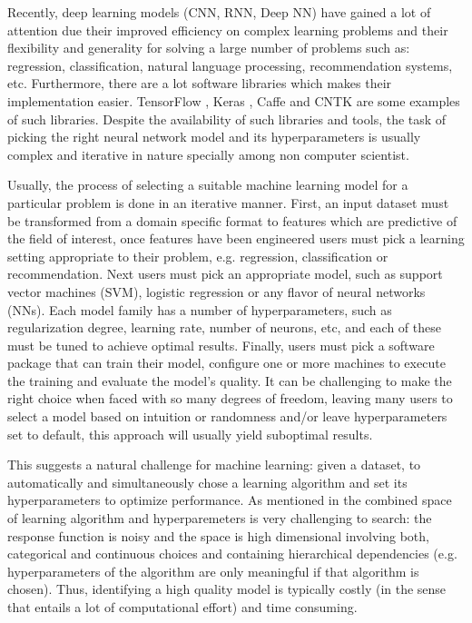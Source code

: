 \documentclass[journal]{IEEEtran}
\begin{document}
Recently, deep learning models (CNN, RNN, Deep NN) have gained a lot of attention due their improved efficiency on complex learning problems and their flexibility and generality for solving a large number of problems such as: regression, classification, natural language processing, recommendation systems, etc. Furthermore, there are a lot software libraries which makes their implementation easier. TensorFlow \cite{TensorFlow2015}, Keras \cite{keras2015}, Caffe \cite{caffe2014} and CNTK \cite{cntk2016} are some examples of such libraries. Despite the availability of such libraries and tools, the task of picking the right neural network model  and its hyperparameters is usually complex and iterative in nature specially among non computer scientist.

Usually, the process of selecting a suitable machine learning model for a particular problem is done in an iterative manner. First, an input dataset must be transformed from a domain specific format to features which are predictive of the field of interest, once features have been engineered users must pick a learning setting appropriate to their problem, e.g. regression, classification or recommendation. Next users must pick an appropriate model, such as support vector machines (SVM), logistic regression or any flavor of neural networks (NNs). Each model family has a number of hyperparameters, such as regularization degree, learning rate, number of neurons, etc, and each of these must be tuned to achieve optimal results. Finally, users must pick a software package that can train their model, configure one or more machines to execute the training and evaluate the model's quality. It can be challenging to make the right choice when faced with so many degrees of freedom, leaving many users to select a model based on intuition or randomness and/or leave hyperparameters set to default, this approach will usually yield suboptimal results.

This suggests a natural challenge for machine learning: given a dataset, to automatically and simultaneously chose a learning algorithm and set its hyperparameters to optimize performance. As mentioned in \cite{Hall2009} the combined space of learning algorithm and hyperparemeters is very challenging to search: the response function is noisy and the space is high dimensional involving both, categorical and continuous choices and containing hierarchical dependencies (e.g. hyperparameters of the algorithm are only meaningful if that algorithm is chosen). Thus, identifying a high quality model is typically costly (in the sense that entails a lot of computational effort) and time consuming.
\end{document}
